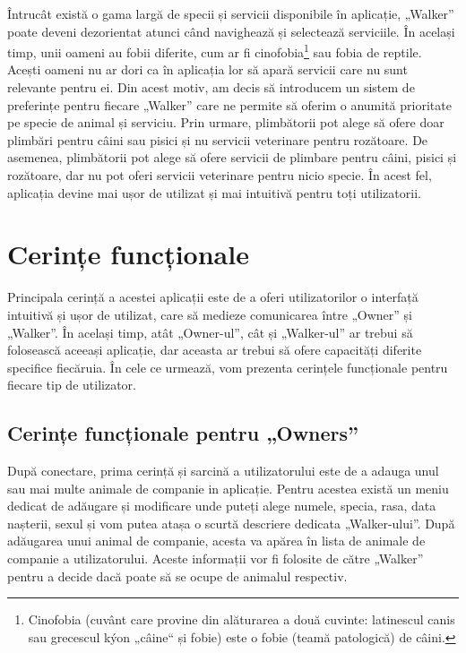 Întrucât există o gama largă de specii și servicii disponibile în aplicație, „Walker” poate deveni dezorientat atunci când navighează și selectează serviciile. În același timp, unii oameni au fobii diferite, cum ar fi cinofobia\footnote{Cinofobia (cuvânt care provine din alăturarea a două cuvinte: latinescul canis sau grecescul kýon „câine“ și fobie) este o fobie (teamă patologică) de câini. } sau fobia de reptile. Acești oameni nu ar dori ca în aplicația lor să apară servicii care nu sunt relevante pentru ei. Din acest motiv, am decis să introducem un sistem de preferințe pentru fiecare „Walker” care ne permite să oferim o anumită prioritate pe specie de animal și serviciu. Prin urmare, plimbătorii pot alege să ofere doar plimbări pentru câini sau pisici și nu servicii veterinare pentru rozătoare. De asemenea, plimbătorii pot alege să ofere servicii de plimbare pentru câini, pisici și rozătoare, dar nu pot oferi servicii veterinare pentru nicio specie. În acest fel, aplicația devine mai ușor de utilizat și mai intuitivă pentru toți utilizatorii.


\section{Cerințe funcționale}

Principala cerință a acestei aplicații este de a oferi utilizatorilor o interfață intuitivă și ușor de utilizat, care să medieze comunicarea între „Owner” și „Walker”. În același timp, atât „Owner-ul”, cât și „Walker-ul” ar trebui să folosească aceeași aplicație, dar aceasta ar trebui să ofere capacități diferite specifice fiecăruia. În cele ce urmează, vom prezenta cerințele funcționale pentru fiecare tip de utilizator.

\subsection{Cerințe funcționale pentru „Owners”}

După conectare, prima cerință și sarcină a utilizatorului este de a adauga unul sau mai multe animale de companie in aplicație. Pentru acestea există un meniu dedicat de adăugare și modificare unde puteți alege numele, specia, rasa, data nașterii, sexul și vom putea atașa o scurtă descriere dedicata „Walker-ului”. După adăugarea unui animal de companie, acesta va apărea în lista de animale de companie a utilizatorului. Aceste informații vor fi folosite de către „Walker” pentru a decide dacă poate să se ocupe de animalul respectiv. 

